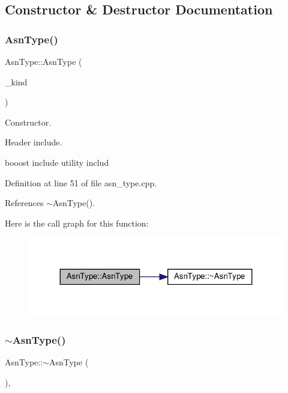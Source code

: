 \subsection{Constructor \& Destructor Documentation}
\mbox{\label{classAsnType_ad3a9031cce2ee85f2dbb5b9ca4c97340}} 
\subsubsection{\texorpdfstring{Asn\+Type()}{AsnType()}}
{\footnotesize\ttfamily Asn\+Type\+::\+Asn\+Type (\begin{DoxyParamCaption}\item[{const \hyperlink{asn__type_8hpp_a8d6021a223e1d3f16d93cac2f5ab45c3}{Asn\+Type\+\_\+\+Kind}}]{\+\_\+kind }\end{DoxyParamCaption})\hspace{0.3cm}{\ttfamily [explicit]}}



Constructor. 

Header include.

booost include utility includ 

Definition at line 51 of file asn\+\_\+type.\+cpp.



References $\sim$\+Asn\+Type().

Here is the call graph for this function\+:
\nopagebreak
\begin{figure}[H]
\begin{center}
\leavevmode
\includegraphics[width=324pt]{db/d35/classAsnType_ad3a9031cce2ee85f2dbb5b9ca4c97340_cgraph}
\end{center}
\end{figure}
\mbox{\label{classAsnType_aefbf788bb09a371193c8b3524322d62a}} 
\subsubsection{\texorpdfstring{$\sim$\+Asn\+Type()}{~AsnType()}}
{\footnotesize\ttfamily Asn\+Type\+::$\sim$\+Asn\+Type (\begin{DoxyParamCaption}{ }\end{DoxyParamCaption})\hspace{0.3cm}{\ttfamily [virtual]}, {\ttfamily [default]}}



